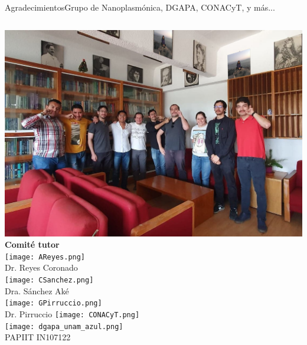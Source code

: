 
\begin{frame}{Agradecimientos}{Grupo de Nanoplasmónica, DGAPA, CONACyT, y más...}%

 \begin{columns}
    \centering
    \includegraphics[width = .9\textwidth]{grupo3.jpg}
 \centering
 \textbf{\large Comité tutor}\\[1em]
       \texttt{[image: AReyes.png]}\\ {\small Dr. Reyes Coronado}\\[.75em]
        \texttt{[image: CSanchez.png]}\\ {\small Dra. Sánchez Aké}\\[.75em]
         \texttt{[image: GPirruccio.png]}\\ {\small Dr. Pirruccio}
 \centering
 \texttt{[image: CONACyT.png]}\\[4em]
 \texttt{[image: dgapa\_unam\_azul.png]}\\
 {\small PAPIIT IN107122}\\[2em]
\end{columns}
\end{frame}
